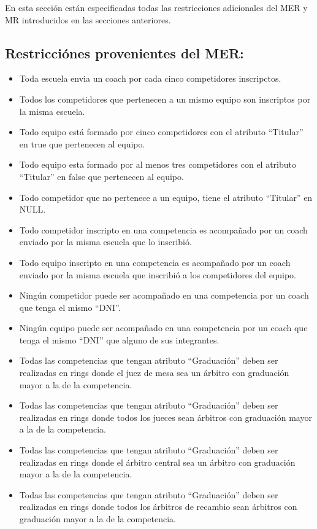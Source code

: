 En esta sección están especificadas todas las restricciones adicionales del MER y MR introducidos en las secciones anteriores.

\subsection{Restricciónes provenientes del MER:}
\begin{itemize}
\item Toda escuela envia un coach por cada cinco competidores inscripctos.
\item Todos los competidores que pertenecen a un mismo equipo son inscriptos por la misma escuela.
\item Todo equipo está formado por cinco competidores con el atributo ``Titular'' en true que pertenecen al equipo.
\item Todo equipo esta formado por al menos tres competidores con el atributo ``Titular'' en false que pertenecen al equipo.
\item Todo competidor que no pertenece a un equipo, tiene el atributo ``Titular'' en NULL.
\item Todo competidor inscripto en una competencia es acompañado por un coach enviado por la misma escuela que lo inscribió.
\item Todo equipo inscripto en una competencia es acompañado por un coach enviado por la misma escuela que inscribió a los competidores del equipo.
\item Ningún competidor puede ser acompañado en una competencia por un coach que tenga el mismo ``DNI''.
\item Ningún equipo puede ser acompañado en una competencia por un coach que tenga el mismo ``DNI'' que alguno de sus integrantes.
\item Todas las competencias que tengan atributo ``Graduación'' deben ser realizadas en rings donde el juez de mesa sea un árbitro con graduación mayor a la de la competencia.
\item Todas las competencias que tengan atributo ``Graduación'' deben ser realizadas en rings donde todos los jueces sean árbitros con graduación mayor a la de la competencia.
\item Todas las competencias que tengan atributo ``Graduación'' deben ser realizadas en rings donde el árbitro central sea un árbitro con graduación mayor a la de la competencia.
\item Todas las competencias que tengan atributo ``Graduación'' deben ser realizadas en rings donde todos los árbitros de recambio sean árbitros con graduación mayor a la de la competencia.

\end{itemize}
